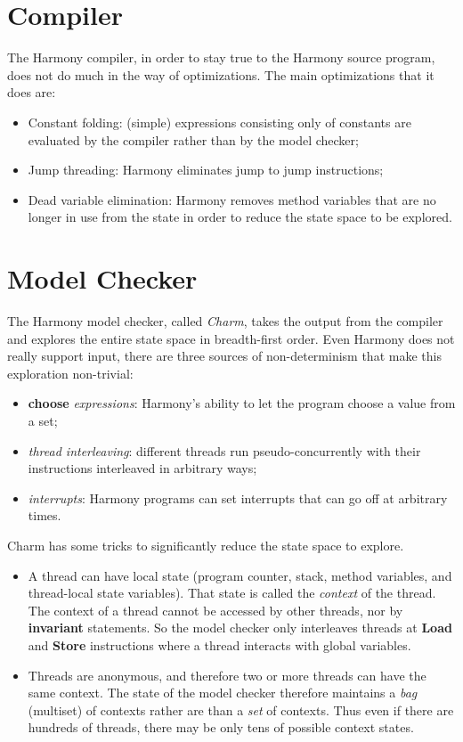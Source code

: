 \documentclass{report}
\begin{document}
\section{Compiler}

The Harmony compiler, in order to stay true to the Harmony source program,
does not do much in the way of optimizations.  The main optimizations that
it does are:

\begin{itemize}
\item Constant folding: (simple) expressions consisting only of constants
are evaluated by the compiler rather than by the model checker;
\item Jump threading: Harmony eliminates jump to jump instructions;
\item Dead variable elimination: Harmony removes method variables that
are no longer in use from the state in order to reduce the state space
to be explored.
\end{itemize}

\section{Model Checker}

The Harmony model checker, called \emph{Charm}, takes the output from
the compiler and explores the entire state space in breadth-first order.
Even Harmony does not really support input, there are three sources of
non-determinism that make this exploration non-trivial:

\begin{itemize}
\item \textbf{choose} \emph{expressions}: Harmony's ability to let the program
choose a value from a set;
\item \emph{thread interleaving}: different threads run pseudo-concurrently
with their instructions interleaved in arbitrary ways;
\item \emph{interrupts}: Harmony programs can set interrupts that can go
off at arbitrary times.
\end{itemize}

Charm has some tricks to significantly reduce the state space to explore.
\begin{itemize}
\item A thread can have local state (program counter, stack,
method variables, and thread-local state variables).
That state is called the \emph{context} of the thread.
The context of a thread cannot be accessed by other
threads, nor by \textbf{invariant} statements.
So the model checker only interleaves threads at \textbf{Load} and
\textbf{Store} instructions where a thread interacts with global
variables.
\item Threads are anonymous, and therefore two or more threads can
have the same context.  The state of the model checker therefore maintains
a \emph{bag} (multiset) of contexts rather are than a \emph{set} of contexts.
Thus even if there are hundreds of threads, there may be only tens of
possible context states.
\end{itemize}
\end{document}
